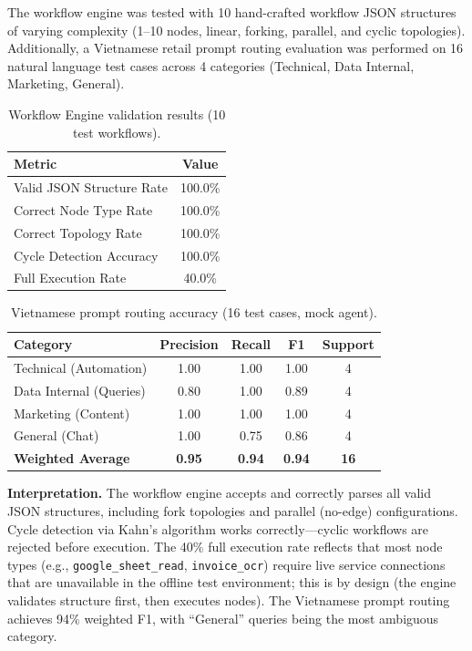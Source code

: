 \documentclass[11pt,a4paper]{report}
\begin{document}
The workflow engine was tested with 10 hand-crafted workflow JSON structures of varying complexity (1--10 nodes, linear, forking, parallel, and cyclic topologies). Additionally, a Vietnamese retail prompt routing evaluation was performed on 16 natural language test cases across 4 categories (Technical, Data Internal, Marketing, General).

\begin{table}[H]
\centering
\caption{Workflow Engine validation results (10 test workflows).}
\label{tab:pillar3}
\small
\begin{tabular}{lc}
\toprule
\textbf{Metric} & \textbf{Value} \\
\midrule
Valid JSON Structure Rate      & 100.0\% \\
Correct Node Type Rate         & 100.0\% \\
Correct Topology Rate          & 100.0\% \\
Cycle Detection Accuracy       & 100.0\% \\
Full Execution Rate            & 40.0\%  \\
\bottomrule
\end{tabular}
\end{table}

\begin{table}[H]
\centering
\caption{Vietnamese prompt routing accuracy (16 test cases, mock agent).}
\label{tab:routing-vn}
\small
\begin{tabular}{lcccc}
\toprule
\textbf{Category} & \textbf{Precision} & \textbf{Recall} & \textbf{F1} & \textbf{Support} \\
\midrule
Technical (Automation) & 1.00 & 1.00 & 1.00 & 4 \\
Data Internal (Queries) & 0.80 & 1.00 & 0.89 & 4 \\
Marketing (Content) & 1.00 & 1.00 & 1.00 & 4 \\
General (Chat) & 1.00 & 0.75 & 0.86 & 4 \\
\midrule
\textbf{Weighted Average} & \textbf{0.95} & \textbf{0.94} & \textbf{0.94} & \textbf{16} \\
\bottomrule
\end{tabular}
\end{table}

\textbf{Interpretation.} The workflow engine accepts and correctly parses all valid JSON structures, including fork topologies and parallel (no-edge) configurations. Cycle detection via Kahn's algorithm works correctly---cyclic workflows are rejected before execution. The 40\% full execution rate reflects that most node types (e.g., \texttt{google\_sheet\_read}, \texttt{invoice\_ocr}) require live service connections that are unavailable in the offline test environment; this is by design (the engine validates structure first, then executes nodes). The Vietnamese prompt routing achieves 94\% weighted F1, with ``General'' queries being the most ambiguous category.
\end{document}

